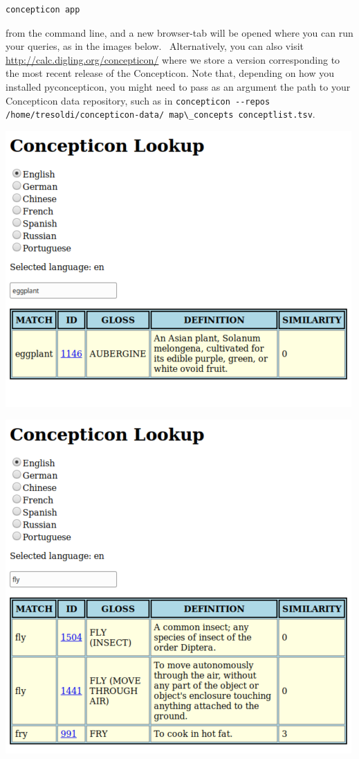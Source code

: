\documentclass[
  a4paper,
  14pt,
  oneside,
  tablecaptionabove
]{scrbook}
\newcommand{\passthrough}[1]{#1}
\begin{document}
\begin{lstlisting}
concepticon app
\end{lstlisting}

from the command line, and a new browser-tab will be opened where you
can run your queries, as in the images below.~ Alternatively, you can
also visit \url{http://calc.digling.org/concepticon/} where we store a
version corresponding to the most recent release of the Concepticon.
Note that, depending on how you installed pyconcepticon, you might need
to pass as an argument the path to your Concepticon data repository,
such as in
\passthrough{\lstinline!concepticon --repos /home/tresoldi/concepticon-data/ map\_concepts conceptlist.tsv!}.

\includegraphics[width=5.20833in,height=4.15625in]{images/__f.hypotheses.org_wp-content_blogs.dir_4500_files_2019_03_Screenshot_2019-03-26-Concepticon-Lookup-eggplant-500x399.png}

\includegraphics[width=5.20833in,height=5.02083in]{images/__f.hypotheses.org_wp-content_blogs.dir_4500_files_2019_03_Screenshot_2019-03-26-Concepticon-Lookup-fly-500x482.png}
\end{document}
